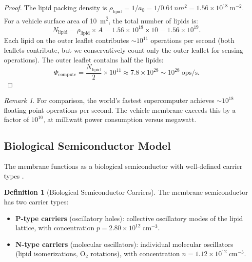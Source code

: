 \documentclass[12pt]{article}
\theoremstyle{definition}
\newtheorem{definition}[theorem]{Definition}
\theoremstyle{remark}
\newtheorem{remark}[theorem]{Remark}
\begin{document}
\begin{proof}
The lipid packing density is $\rho_{\mathrm{lipid}} = 1/a_0 = 1/\SI{0.64}{nm^2} = 1.56 \times 10^{18}\;\mathrm{m}^{-2}$. For a vehicle surface area of \SI{10}{m^2}, the total number of lipids is:
\begin{equation}
  N_{\mathrm{lipid}} = \rho_{\mathrm{lipid}} \times A = 1.56 \times 10^{18} \times 10 = 1.56 \times 10^{19}.
  \label{eq:n_lipid}
\end{equation}
Each lipid on the outer leaflet contributes $\sim 10^{11}$ operations per second (both leaflets contribute, but we conservatively count only the outer leaflet for sensing operations). The outer leaflet contains half the lipids:
\begin{equation}
  \Phi_{\mathrm{compute}} = \frac{N_{\mathrm{lipid}}}{2} \times 10^{11} \approx 7.8 \times 10^{28} \sim 10^{28}\;\mathrm{ops/s}.
  \label{eq:phi_compute}
\end{equation}
\end{proof}

\begin{remark}
For comparison, the world's fastest supercomputer achieves $\sim 10^{18}$ floating-point operations per second. The vehicle membrane exceeds this by a factor of $10^{10}$, at milliwatt power consumption versus megawatt.
\end{remark}

\subsection{Biological Semiconductor Model}

The membrane functions as a biological semiconductor with well-defined carrier types \cite{sachikonye2025circuits, sze2007physics}.

\begin{definition}[Biological Semiconductor Carriers]
\label{def:bio_semiconductor}
The membrane semiconductor has two carrier types:
\begin{itemize}
  \item \textbf{P-type carriers} (oscillatory holes): collective oscillatory modes of the lipid lattice, with concentration $p = 2.80 \times 10^{12}\;\mathrm{cm}^{-3}$.
  \item \textbf{N-type carriers} (molecular oscillators): individual molecular oscillators (lipid isomerizations, O$_2$ rotations), with concentration $n = 1.12 \times 10^{12}\;\mathrm{cm}^{-3}$.
\end{itemize}
\end{definition}
\end{document}
